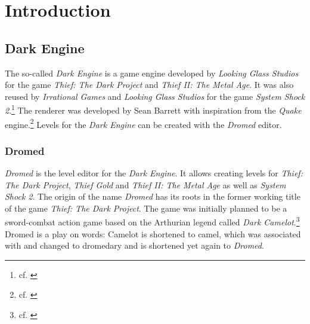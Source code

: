 \listoflistings
\clearpage
 
\section{Introduction}

\subsection{Dark Engine}

The so-called \textit{Dark Engine} is a game engine developed by \textit{Looking Glass Studios} for the game \textit{Thief: The Dark Project} and \textit{Thief II: The Metal Age}. It was also reused by \textit{Irrational Games} and \textit{Looking Glass Studios} for the game \textit{System Shock 2}.\footnote{cf. \cite[p.~7]{grossman2003postmortems}} The renderer was developed by Sean Barrett with inspiration from the \textit{Quake} engine.\footnote{cf. \cite{TheRenderingTechnologyThief}} Levels for the \textit{Dark Engine} can be created with the \textit{Dromed} editor.

\subsubsection{Dromed}

\textit{Dromed} is the level editor for the \textit{Dark Engine}. It allows creating levels for \textit{Thief: The Dark Project}, \textit{Thief Gold} and \textit{Thief II: The Metal Age} as well as \textit{System Shock 2}. The origin of the name \textit{Dromed} has its roots in the former working title of the game \textit{Thief: The Dark Project}. The game was initially planned to be a sword-combat action game based on the Arthurian legend called \textit{Dark Camelot}.\footnote{cf. \cite[p.~171]{grossman2003postmortems}} Dromed is a play on words: Camelot  is shortened to camel, which was associated with and changed to dromedary and is shortened yet again to \textit{Dromed}.

